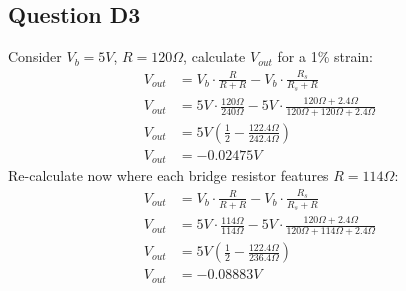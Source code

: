 \documentclass{article}
\begin{document}
\subsection{Question D3}
Consider \(V_b=5V\), \(R=120\Omega\), calculate \(V_{out}\) for a 1\% strain:
\begin{equation}
    \begin{aligned}
        V_{out}&=V_b \cdot \frac{R}{R+R} - V_b \cdot \frac{R_s}{R_s+R} \\
        V_{out}&=5V \cdot \frac{120\Omega}{240\Omega} - 5V \cdot \frac{120\Omega + 2.4\Omega}{120\Omega + 120\Omega + 2.4\Omega} \\
        V_{out}&= 5V \left( \frac{1}{2} - \frac{122.4\Omega}{242.4\Omega} \right) \\
        V_{out}&= -0.02475V
    \end{aligned}
\end{equation}
Re-calculate now where each bridge resistor features \(R=114\Omega\):
\begin{equation}
    \begin{aligned}
        V_{out}&=V_b \cdot \frac{R}{R+R} - V_b \cdot \frac{R_s}{R_s+R} \\
        V_{out}&=5V \cdot \frac{114\Omega}{114\Omega} - 5V \cdot \frac{120\Omega + 2.4\Omega}{120\Omega + 114\Omega + 2.4\Omega} \\
        V_{out}&= 5V \left( \frac{1}{2} - \frac{122.4\Omega}{236.4\Omega} \right) \\
        V_{out}&= -0.08883V
    \end{aligned}
\end{equation}
\newpage
\end{document}
